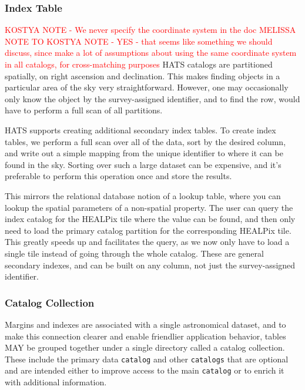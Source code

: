 \documentclass[11pt,a4paper]{ivoa}
\begin{document}
\subsubsection{Index Table} \label{sec:index}
\textcolor{red}{KOSTYA NOTE - We never specify the coordinate system in the doc}
\textcolor{red}{MELISSA NOTE TO KOSTYA NOTE - YES - that seems like something we should discuss, since make a lot of assumptions about using the same coordinate system in all catalogs, for cross-matching purposes}
HATS catalogs are partitioned spatially, on right ascension and declination. 
This makes finding objects in a particular area of the sky very straightforward. 
However, one may occasionally only know the object by the survey-assigned identifier, and to find the row, would have to perform a full scan of all partitions. \par

HATS supports creating additional secondary index tables. 
To create index tables, we perform a full scan over all of the data, sort by the desired column, and write out a simple mapping from the unique identifier to where it can be found in the sky.
Sorting over such a large dataset can be expensive, and it's preferable to perform this operation once and store the results. \par

This mirrors the relational database notion of a lookup table, where you can lookup the spatial parameters of a non-spatial property.
The user can query the index catalog for the HEALPix tile where the value can be found, and then only need to load the primary catalog partition for the corresponding HEALPix tile. 
This greatly speeds up and facilitates the query, as we now only have to load a single tile instead of going through the whole catalog.
These are general secondary indexes, and can be built on any column, not just the survey-assigned identifier.

\subsubsection{Catalog Collection} \label{sec:collection}

Margins and indexes are associated with a single astronomical dataset, and to make this connection clearer and enable friendlier application behavior, tables MAY be grouped together under a single directory called a catalog collection.
These include the primary data \texttt{catalog} and other \texttt{catalogs} that are optional and are intended either to improve access to the main \texttt{catalog} or to enrich it with additional information. 
\end{document}
